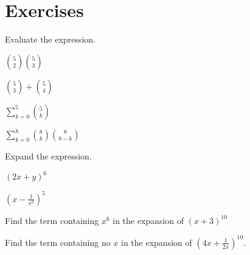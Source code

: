 \newpage

\section*{Exercises}

\begin{exercise}
    Evaluate the expression.\\
    \begin{enumerate*}
        \item $\binom{5}{2}\binom{5}{3}$
        \item $\binom{5}{3}+\binom{5}{4}$
        \item $\sum\limits_{k=0}^5\binom{5}{k}$
        \item $\sum\limits_{k=0}^8\binom{8}{k}\binom{8}{8-k}$\hfill\null
    \end{enumerate*}
\end{exercise}

\begin{exercise}
Expand the expression.\\
\begin{enumerate*}
    \item $\left(2x+y\right)^6$
    \item $\left(x-\frac{1}{x^2}\right)^5$\hfill\null
\end{enumerate*}
\end{exercise}

\begin{exercise}
    Find the term containing $x^6$ in the expansion of $(x+3)^{10}$
\end{exercise}
\begin{exercise}
    Find the term containing no $x$ in the expansion of $\left(4x+\frac{1}{2x}\right)^{10}$.
\end{exercise}
